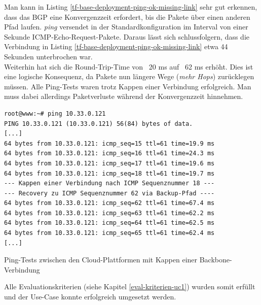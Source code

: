 Man kann in Listing \ref{tf-base-deployment-ping-ok-missing-link} sehr gut erkennen, dass das BGP eine Konvergenzzeit erfordert, bis die Pakete über einen anderen Pfad laufen. \textit{ping} versendet in der Standardkonfiguration im Interval von einer Sekunde ICMP-Echo-Request-Pakete. Daraus lässt sich schlussfolgern, dass die Verbindung in Listing \ref{tf-base-deployment-ping-ok-missing-link} etwa 44 Sekunden unterbrochen war.\\
Weiterhin hat sich die Round-Trip-Time von ~20 ms auf ~62 ms erhöht. Dies ist eine logische Konsequenz, da Pakete nun längere Wege (\textit{mehr Hops}) zurücklegen müssen. Alle Ping-Tests waren trotz Kappen einer Verbindung erfolgreich. Man muss dabei allerdings Paketverluste während der Konvergenzzeit hinnehmen.
\begin{listing}[h]
\begin{verbatim}
root@www:~# ping 10.33.0.121
PING 10.33.0.121 (10.33.0.121) 56(84) bytes of data.
[...]
64 bytes from 10.33.0.121: icmp_seq=15 ttl=61 time=19.9 ms
64 bytes from 10.33.0.121: icmp_seq=16 ttl=61 time=24.3 ms
64 bytes from 10.33.0.121: icmp_seq=17 ttl=61 time=19.6 ms
64 bytes from 10.33.0.121: icmp_seq=18 ttl=61 time=19.7 ms 
--- Kappen einer Verbindung nach ICMP Sequenznummer 18 ---
--- Recovery zu ICMP Sequenznummer 62 via Backup-Pfad ----
64 bytes from 10.33.0.121: icmp_seq=62 ttl=61 time=67.4 ms
64 bytes from 10.33.0.121: icmp_seq=63 ttl=61 time=62.2 ms
64 bytes from 10.33.0.121: icmp_seq=64 ttl=61 time=62.5 ms
64 bytes from 10.33.0.121: icmp_seq=65 ttl=61 time=62.4 ms
[...]
\end{verbatim}
\caption{Ping-Tests zwischen den Cloud-Plattformen mit Kappen einer Backbone-Verbindung}
\label{tf-base-deployment-ping-ok-missing-link}
\end{listing}\FloatBarrier
Alle Evaluationskriterien (siehe Kapitel \ref{eval-kriterien-uc1}) wurden somit erfüllt und der Use-Case konnte erfolgreich umgesetzt werden.
